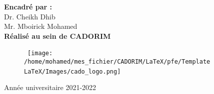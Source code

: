 \documentclass[a4paper, 12pt]{report}
\begin{document}
\begin{titlepage}
\begin{center}
			{\bf Encadré par :}\\
			{Dr. Cheikh Dhib} \\
			{Mr. Mboirick Mohamed} \\
			{\bf Réalisé au sein de CADORIM }
			
			
		\end{center}
		\begin{figure}[htbp]
		\hbox{
			\hspace*{5cm}
			\texttt{[image: /home/mohamed/mes\_fichier/CADORIM/LaTeX/pfe/Template LaTeX/Images/cado\_logo.png]}
		} 
		\end{figure}
		
		\begin{center}
			Année universitaire 2021-2022
		\end{center}
	\end{titlepage}
\end{document}
